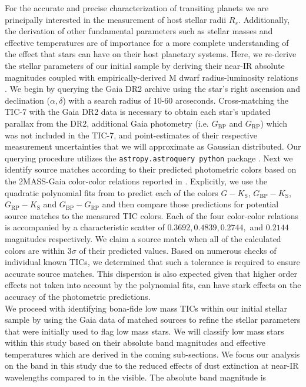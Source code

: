 For the accurate and precise characterization of transiting planets we are principally
interested in the measurement of host stellar radii $R_s$. Additionally, the derivation of other fundamental
parameters such as stellar masses and effective temperatures are of importance for a more complete understanding
of the effect that stars can have on their host planetary systems. Here, we re-derive
the stellar parameters of our initial sample by deriving their near-IR absolute magnitudes coupled with
empirically-derived M dwarf radius-luminosity relations \citep{mann15}. We begin by querying the Gaia DR2
archive using the star's right ascension and declination ($\alpha,\delta$) with a search radius of 10-60 arcseconds.
Cross-matching the TIC-7 with the Gaia DR2 data is necessary to obtain each star's updated parallax from the DR2,
additional Gaia photometry (i.e. $G_{\text{BP}}$ and $G_{\text{RP}}$) which was not included in the TIC-7,
and point-estimates of their respective measurement uncertainties that we will approximate as Gaussian distributed.
Our querying procedure utilizes the \texttt{astropy.astroquery python} package \citep{ginsburg17}.
Next we identify source matches according to their predicted photometric colors based on the 2MASS-Gaia
color-color relations reported in \cite{evans18}. Explicitly, we use the quadratic polynomial fits from
\cite{evans18} to predict each of the colors
$G-K_{\text{S}}$, $G_{\text{BP}}-K_{\text{S}}$, $G_{\text{RP}}-K_{\text{S}}$ and $G_{\text{BP}}-G_{\text{RP}}$ and then compare
those predictions for potential source matches to the measured TIC colors. Each of the four color-color
relations is accompanied by a characteristic scatter of $0.3692, 0.4839, 0.2744,$ and $0.2144$ magnitudes
respectively. We claim a source match when all of the calculated colors are within $3\sigma$ of their predicted
values. Based on numerous checks of individual known TICs, we determined
that such a tolerance is required to ensure accurate source matches. This dispersion is also expected given
that higher order effects not taken into account by the polynomial fits, can have stark effects on the accuracy
of the photometric predictions. \\

We proceed with identifying bona-fide low mass TICs within our initial stellar sample by using the Gaia data
of matched sources to refine the stellar parameters that were initially used to flag low mass stars. 
We will classify low mass stars within this study based on their absolute \Ks{-}band magnitudes
\citep{delfosse00,mann15,benedict16} and effective temperatures which are derived in the coming sub-sections.
We focus our analysis on the \Ks{-}band in this study due to the reduced effects of dust
extinction at near-IR wavelengths compared to in the visible. The absolute \Ks{-}band magnitude is

